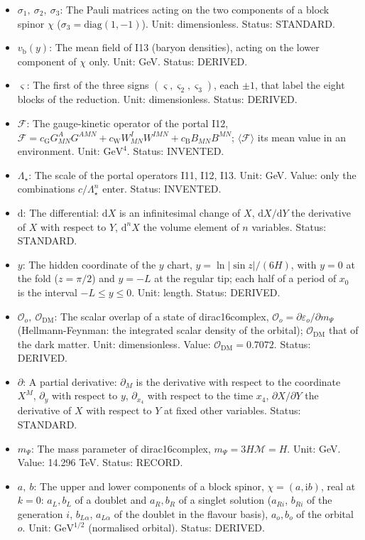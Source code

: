 \documentclass[
  10pt,
]{article}
\begin{document}
\begin{itemize}
\item
  \(\sigma_1,\ \sigma_2,\ \sigma_3\): The Pauli matrices acting on the
  two components of a block spinor \(\chi\)
  (\(\sigma_3 = \mathrm{diag}(1, -1)\)). Unit: dimensionless. Status:
  STANDARD.
\item
  \(v_{\mathrm{b}}(y)\): The mean field of I13 (baryon densities),
  acting on the lower component of \(\chi\) only. Unit: GeV. Status:
  DERIVED.
\item
  \(\varsigma\): The first of the three signs
  \((\varsigma, \varsigma_2, \varsigma_3)\), each \(\pm1\), that label
  the eight blocks of the reduction. Unit: dimensionless. Status:
  DERIVED.
\item
  \(\mathcal{F}\): The gauge-kinetic operator of the portal I12,
  \(\mathcal{F} = c_{\mathrm{G}}G^A_{MN}G^{AMN} + c_{\mathrm{W}}W^I_{MN}W^{IMN} + c_{\mathrm{B}}B_{MN}B^{MN}\);
  \(\langle\mathcal{F}\rangle\) its mean value in an environment. Unit:
  \(\mathrm{GeV}^{4}\). Status: INVENTED.
\item
  \(\Lambda_\star\): The scale of the portal operators I11, I12, I13.
  Unit: GeV. Value: only the combinations \(c/\Lambda_\star^n\) enter.
  Status: INVENTED.
\item
  \(\mathrm{d}\): The differential: \(\mathrm{d}X\) is an infinitesimal
  change of \(X\), \(\mathrm{d}X/\mathrm{d}Y\) the derivative of \(X\)
  with respect to \(Y\), \(\mathrm{d}^nX\) the volume element of \(n\)
  variables. Status: STANDARD.
\item
  \(y\): The hidden coordinate of the \(y\) chart,
  \(y = \ln\lvert\sin z\rvert/(6H)\), with \(y = 0\) at the fold
  (\(z = \pi/2\)) and \(y = -L\) at the regular tip; each half of a
  period of \(x_0\) is the interval \(-L \le y \le 0\). Unit: length.
  Status: DERIVED.
\item
  \(\mathcal{O}_o,\ \mathcal{O}_{\mathrm{DM}}\): The scalar overlap of a
  state of dirac16complex,
  \(\mathcal{O}_o = \partial\varepsilon_o/\partial m_\Psi\)
  (Hellmann-Feynman: the integrated scalar density of the orbital);
  \(\mathcal{O}_{\mathrm{DM}}\) that of the dark matter. Unit:
  dimensionless. Value: \(\mathcal{O}_{\mathrm{DM}} = 0.7072\). Status:
  DERIVED.
\item
  \(\partial\): A partial derivative: \(\partial_M\) is the derivative
  with respect to the coordinate \(X^M\), \(\partial_y\) with respect to
  \(y\), \(\partial_{x_4}\) with respect to the time \(x_4\),
  \(\partial X/\partial Y\) the derivative of \(X\) with respect to
  \(Y\) at fixed other variables. Status: STANDARD.
\item
  \(m_\Psi\): The mass parameter of dirac16complex,
  \(m_\Psi = 3H\mathcal{M} = H\). Unit: GeV. Value: 14.296 TeV. Status:
  RECORD.
\item
  \(a,\ b\): The upper and lower components of a block spinor,
  \(\chi = (a, \mathrm{i}b)\), real at \(k = 0\): \(a_L, b_L\) of a
  doublet and \(a_R, b_R\) of a singlet solution (\(a_{Ri}\), \(b_{Ri}\)
  of the generation \(i\), \(b_{L\alpha}\), \(a_{L\alpha}\) of the
  doublet in the flavour basis), \(a_o, b_o\) of the orbital \(o\).
  Unit: \(\mathrm{GeV}^{1/2}\) (normalised orbital). Status: DERIVED.
\end{itemize}
\end{document}
